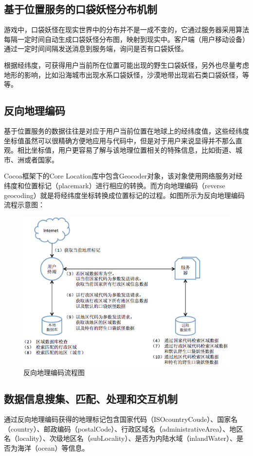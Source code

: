 \documentclass{article}
\begin{document}
\begin{CJK}{UTF8}{gbsn}
	\section{基于位置服务的口袋妖怪分布机制}
  游戏中，口袋妖怪在现实世界中的分布并不是一成不变的，它通过服务器采用算法每隔一定时间自动生成口袋妖怪分布图，映射到现实中。客户端（用户移动设备）通过一定时间间隔发送消息到服务端，询问是否有口袋妖怪。
  
  根据经纬度，可获得用户当前所在位置可能出现的野生口袋妖怪，另外也尽量考虑地形的影响，比如沿海城市出现水系口袋妖怪，沙漠地带出现岩石类口袋妖怪，等等。

	\subsection{反向地理编码}
  基于位置服务的数据往往是对应于用户当前位置在地球上的经纬度值，这些经纬度坐标值虽然可以很精确方便地应用与代码中，但是对于用户来说显得并不那么直观。相比坐标值，用户更容易了解与该地理位置相关的特殊信息，比如街道、城市、洲或者国家。\cite{iOSLIB}

  Cocoa框架下的Core Location库中包含Geocoder对象，该对象使用网络服务对经纬度和位置标记（placemark）进行相应的转换。而方向地理编码（reverse geocoding）就是将经纬度坐标转换成位置标记的过程。如图所示为反向地理编码流程示意图：

  \begin{figure}[htbp]
		\centering
		\includegraphics[bb=0 0 548 341, scale=0.45]{figure/fig_n19.png}
		\caption{反向地理编码流程图}
		\label{fig:n19}
	\end{figure}

	\subsection{数据信息搜集、匹配、处理和交互机制}
  通过反向地理编码获得的地理标记包含国家代码（ISOcountryCoude）、国家名（country）、邮政编码（postalCode）、行政区域名（administrativeArea）、地区名（locality）、次级地区名（subLocality）、是否为内陆水域（inlandWater）、是否为海洋（ocean）等信息。


\end{CJK}
\end{document}

